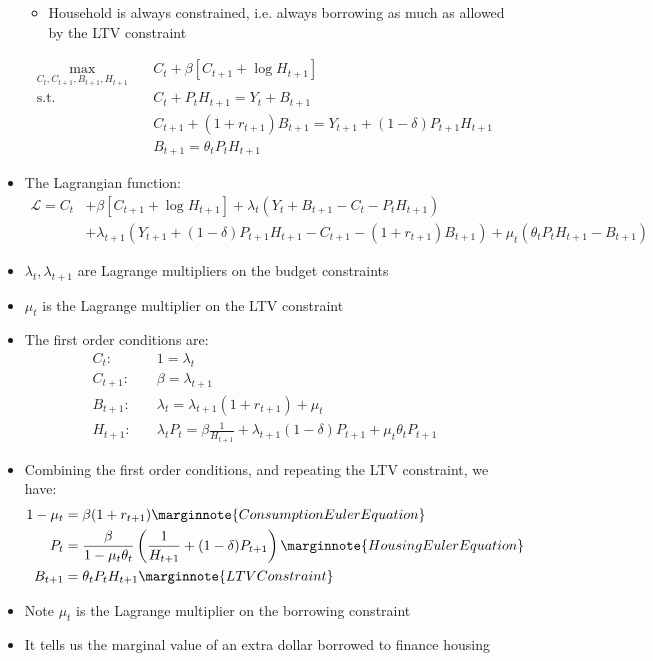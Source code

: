 \documentclass{article}
\numberwithin{equation}{section}
\numberwithin{figure}{section}
\begin{document}
\begin{itemize}
\begin{itemize}
			\item Household is always constrained, i.e. always borrowing as much as allowed by the LTV constraint
		\end{itemize}
		\begin{align*}
			\max_{C_t,C_{t+1},B_{t+1},H_{t+1}}\quad &C_t + \beta[C_{t+1} + \log H_{t+1}]\\
			\text{s.t.}\quad &C_t + P_t H_{t+1} = Y_t + B_{t+1}\\
			&C_{t+1} + (1+r_{t+1})B_{t+1} = Y_{t+1} + (1-\delta)P_{t+1}H_{t+1}\\
			&B_{t+1} = \theta_tP_tH_{t+1}
		\end{align*}
		\item The Lagrangian function:
		\begin{align*}
			\mathcal{L} = C_t &+ \beta[C_{t+1} + \log H_{t+1}] + \lambda_t(Y_t + B_{t+1} - C_t - P_t H_{t+1})\\ 
			&+ \lambda_{t+1}(Y_{t+1} + (1-\delta)P_{t+1}H_{t+1} - C_{t+1} - (1+r_{t+1})B_{t+1}) + \mu_t(\theta_tP_tH_{t+1} - B_{t+1})
		\end{align*}
		\item \( \lambda_t,\lambda_{t+1} \) are Lagrange multipliers on the budget constraints
		\item \( \mu_t \) is the Lagrange multiplier on the LTV constraint
		\item The first order conditions are:
		\begin{align*}
			C_t:& \quad1=\lambda_t\\
			C_{t+1}:& \quad\beta=\lambda_{t+1}\\
			B_{t+1}:& \quad\lambda_t=\lambda_{t+1}(1+r_{t+1})+\mu_t\\
			H_{t+1}:& \quad\lambda_tP_t=\beta\frac{1}{H_{t+1}}+\lambda_{t+1}(1-\delta)P_{t+1}+\mu_t\theta_tP_{t+1}
		\end{align*}
		\item Combining the first order conditions, and repeating the LTV constraint, we have:
		\begin{align*}
			1-\mu_t&=\beta(1+r_{t+1}) \marginnote{Consumption Euler Equation}\\
			P_t&=\frac{\beta}{1-\mu_t\theta_t}\left( \frac{1}{H_{t+1}} + (1-\delta)P_{t+1} \right)\marginnote{Housing Euler Equation}\\
			B_{t+1}&=\theta_tP_tH_{t+1} \marginnote{LTV Constraint}
		\end{align*}
		\item Note \( \mu_t \) is the Lagrange multiplier on the borrowing constraint
		\item It tells us the marginal value of an extra dollar borrowed to finance housing
	\end{itemize}
\end{document}
